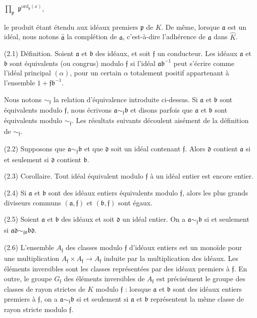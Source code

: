 \documentclass[11pt]{article}
\begin{document}
\par
\(\prod _{𝔭}\) \(𝔭^{\mathrm{ord}_{𝔭}(x)}\),\par
\par
le produit étant étendu aux idéaux premiers \(𝔭\) de \(K\). De même, lorsque \(𝔞\) est un idéal, nous notons \(\widehat{𝔞}\) la complétion de \(𝔞\), c’est-à-dire l’adhérence de \(𝔞\) dans \(\widehat{K}\).\par
\par
(2.1) Définition. Soient \(𝔞\) et \(𝔟\) des idéaux, et soit \(𝔣\) un conducteur. Les idéaux \(𝔞\) et \(𝔟\) sont équivalents (ou congrus) modulo \(𝔣\) si l’idéal \(𝔞𝔟^{-1}\) peut s’écrire comme l’idéal principal \((\alpha )\), pour un certain \(\alpha \) totalement positif appartenant à l’ensemble \(1+𝔣𝔟^{-1}\).\par
\par
Nous notons \(\sim _{𝔣}\) la relation d’équivalence introduite ci-dessus. Si \(𝔞\) et \(𝔟\) sont équivalents modulo \(𝔣\), nous écrivons \(𝔞\sim _{𝔣}𝔟\) et disons parfois que \(𝔞\) et \(𝔟\) sont équivalents modulo \(\sim _{𝔣}\). Les résultats suivants découlent aisément de la définition de \(\sim _{𝔣}\).\par
\par
(2.2) Supposons que \(𝔞\sim _{𝔣}𝔟\) et que \(𝔡\) soit un idéal contenant \(𝔣\). Alors \(𝔡\) contient \(𝔞\) si et seulement si \(𝔡\) contient \(𝔟\).\par
\par
(2.3) Corollaire. Tout idéal équivalent modulo \(𝔣\) à un idéal entier est encore entier.\par
\par
(2.4) Si \(𝔞\) et \(𝔟\) sont des idéaux entiers équivalents modulo \(𝔣\), alors les plus grands diviseurs communs \((𝔞,𝔣)\) et \((𝔟,𝔣)\) sont égaux.\par
\par
(2.5) Soient \(𝔞\) et \(𝔟\) des idéaux et soit \(𝔡\) un idéal entier. On a \(𝔞\sim _{𝔣}𝔟\) si et seulement si \(𝔞𝔡\sim _{𝔣𝔡}𝔟𝔡\).\par
\par
(2.6) L’ensemble \(A_{𝔣}\) des classes modulo \(𝔣\) d’idéaux entiers est un monoïde pour une multiplication \(A_{𝔣}\times A_{𝔣}\to A_{𝔣}\) induite par la multiplication des idéaux. Les éléments inversibles sont les classes représentées par des idéaux premiers à \(𝔣\). En outre, le groupe \(G_{𝔣}\) des éléments inversibles de \(A_{𝔣}\) est précisément le groupe des classes de rayon strictes de \(K\) modulo \(𝔣\) : lorsque \(𝔞\) et \(𝔟\) sont des idéaux entiers premiers à \(𝔣\), on a \(𝔞\sim _{𝔣}𝔟\) si et seulement si \(𝔞\) et \(𝔟\) représentent la même classe de rayon stricte modulo \(𝔣\).\par
\end{document}

